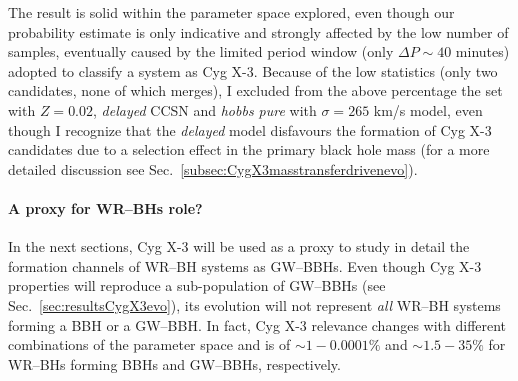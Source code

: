 \documentclass[a4paper,titlepage]{book}     	%
\begin{document}
The result is solid within the parameter space explored, even though our probability estimate is only indicative and strongly affected by the low number of samples, eventually caused by the limited period window (only $\Delta P \sim 40$ minutes) adopted to classify a system as Cyg X-3. Because of the low statistics (only two candidates, none of which merges), I excluded from the above percentage the set with $Z=0.02$, \emph{delayed} CCSN and \emph{hobbs pure} with $\sigma=265$ km/s model, even though I recognize that the \emph{delayed} model disfavours the formation of Cyg X-3 candidates due to a selection effect in the primary black hole mass (for a more detailed discussion see Sec.\ \ref{subsec:CygX3masstransferdrivenevo}).

\paragraph{A proxy for WR--BHs role?} In the next sections, Cyg X-3 will be used as a proxy to study in detail the formation channels of WR--BH systems as GW--BBHs. Even though Cyg X-3 properties will reproduce a sub-population of GW--BBHs (see Sec.\ \ref{sec:resultsCygX3evo}), its evolution will not represent \emph{all} WR--BH systems forming a BBH or a GW--BBH. In fact, Cyg X-3 relevance changes with different combinations of the parameter space and is of $\sim 1-0.0001\%$  and  $\sim 1.5 - 35 \%$ for WR--BHs forming BBHs and GW--BBHs, respectively.
\end{document}

